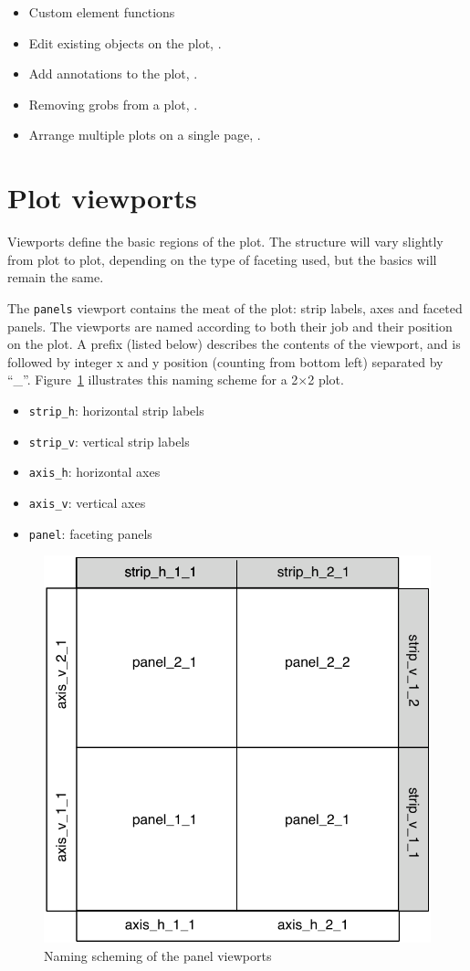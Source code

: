 \begin{itemize}
  \item Custom element functions
  \item Edit existing objects on the plot, .
  \item Add annotations to the plot, .
  \item Removing grobs from a plot, .
  \item Arrange multiple plots on a single page, .
\end{itemize}

\section{Plot viewports}
\label{sec:plot-viewports}

Viewports define the basic regions of the plot.  The structure will vary slightly from plot to plot, depending on the type of faceting used, but the basics will remain the same. 

The {\tt panels} viewport contains the meat of the plot: strip labels, axes and faceted panels.  The viewports are named according to both their job and their position on the plot.  A prefix (listed below) describes the contents of the viewport, and is followed by integer x and y position (counting from bottom left) separated by ``\_''.  Figure~\ref{fig:panelvp} illustrates this naming scheme for a 2$\times$2 plot.

\begin{itemize}
  \item {\tt strip\_h}: horizontal strip labels
  \item {\tt strip\_v}: vertical strip labels
  \item {\tt axis\_h}: horizontal axes
  \item {\tt axis\_v}: vertical axes
  \item {\tt panel}: faceting panels
\end{itemize}

\begin{figure}[htbp]
  \centering
    \includegraphics[width=0.5 \textwidth]{grid-panelvp}
  \caption{Naming scheming of the panel viewports}
  \label{fig:panelvp}
\end{figure}

